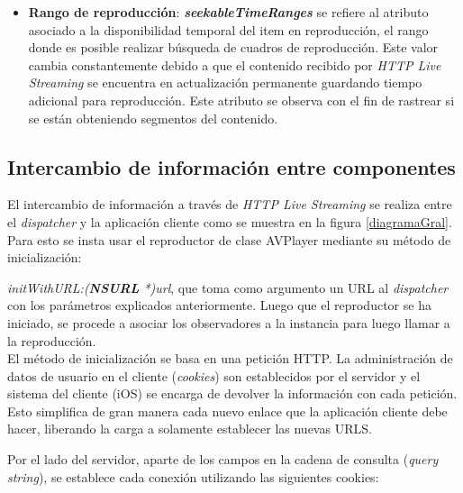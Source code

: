 \begin{itemize}
\item \textbf{Rango de reproducción}: \textit{\textbf{seekableTimeRanges}} se refiere al atributo asociado a la disponibilidad temporal del item en reproducción, el rango donde es posible realizar búsqueda de cuadros de reproducción. Este valor cambia constantemente debido a que el contenido recibido por \textit{HTTP Live Streaming} se encuentra en actualización permanente guardando tiempo adicional para reproducción. Este atributo se observa con el fin de rastrear si se están obteniendo segmentos del contenido.
\end{itemize}
\label{item:seekableTimeRanges}
\label{item:kvo-tracks}
		
\subsection{Intercambio de información entre componentes}
\label{subsec:cookies}

El intercambio de información a través de \textit{HTTP Live Streaming} se realiza entre el \textit{dispatcher} y la aplicación cliente como se muestra en la figura \ref{diagramaGral}. Para esto se insta usar el reproductor de clase AVPlayer mediante su método de inicialización:

\textit{initWithURL:(\textbf{NSURL} *)url}, que toma como argumento un URL al \textit{dispatcher} con los parámetros explicados anteriormente. Luego que el reproductor se ha iniciado, se procede a asociar los observadores a la instancia para luego llamar a la reproducción.\\

El método de inicialización se basa en una petición HTTP. La administración de datos de usuario en el cliente (\textit{cookies}) son establecidos por el servidor y el sistema del cliente (iOS) se encarga de devolver la información con cada petición. Esto simplifica de gran manera cada nuevo enlace que la aplicación cliente debe hacer, liberando la carga a solamente establecer las nuevas URLS.

Por el lado del servidor, aparte de los campos en la cadena de consulta (\textit{query string}), se establece cada conexión utilizando las siguientes cookies:

